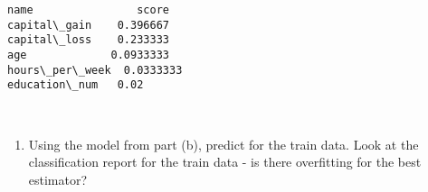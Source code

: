 \documentclass[11pt]{article}
\providecommand{\tightlist}{%
      \setlength{\itemsep}{0pt}\setlength{\parskip}{0pt}}
\begin{document}
    \begin{Verbatim}[commandchars=\\\{\}]
name                score
capital\_gain    0.396667
capital\_loss    0.233333
age             0.0933333
hours\_per\_week  0.0333333
education\_num   0.02

    \end{Verbatim}

    \begin{center}
    \end{center}
    { \hspace*{\fill} \\}
    
    \begin{enumerate}
\def\labelenumi{\alph{enumi})}
\setcounter{enumi}{5}
\tightlist
\item
  Using the model from part (b), predict for the train data. Look at the
  classification report for the train data - is there overfitting for
  the best estimator?
\end{enumerate}
\end{document}
